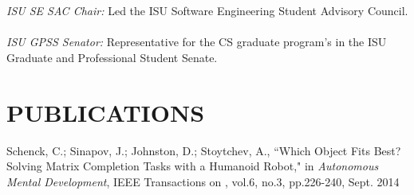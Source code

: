 \documentclass[margin, 10pt]{res} %
\begin{document}
\begin{resume}
{\sl ISU SE SAC Chair:} Led the ISU Software Engineering Student Advisory
  Council.\\
\\
{\sl ISU GPSS Senator:} Representative for the CS graduate program's in the ISU
  Graduate and Professional Student Senate.


\section{PUBLICATIONS}

Schenck, C.; Sinapov, J.; Johnston, D.; Stoytchev, A., ``Which Object Fits Best?
Solving Matrix Completion Tasks with a Humanoid Robot," in {\sl Autonomous
Mental Development}, IEEE Transactions on , vol.6, no.3, pp.226-240, Sept. 2014

\end{resume}
\end{document}
